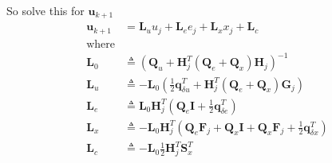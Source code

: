 \documentclass[landscape]{article}
\begin{document}
So solve this for $\mathbf{u}_{k+1}$
\begin{align}
\mathbf{u}_{k+1} & = \mathbf{L}_u u_j + \mathbf{L}_e e_j + \mathbf{L}_x x_j + \mathbf{L}_c \\
\mathrm{where}   & \\
\mathbf{L}_0     & \triangleq  \left(
\mathbf{Q}_u                              
+  \mathbf{H}_j^T (\mathbf{Q}_e + \mathbf{Q}_x)  \mathbf{H}_j 
\right)^{-1}\\
\mathbf{L}_u     & \triangleq -\mathbf{L}_0 \left(
\frac{1}{2} \mathbf{q}_{\delta u}^T                    
+ \mathbf{H}_j^T (\mathbf{Q}_e + \mathbf{Q}_x)  \mathbf{G}_j  
\right)\\
\mathbf{L}_e     & \triangleq  \mathbf{L}_0 \mathbf{H}_j^T\left(
\mathbf{Q}_e  \mathbf{I}
+  \frac{1}{2} \mathbf{q}_{\delta e}^T    
\right)\\
\mathbf{L}_x     & \triangleq -\mathbf{L}_0 \mathbf{H}_j^T\left(
\mathbf{Q}_e  \mathbf{F}_j 
+   \mathbf{Q}_x  \mathbf{I}      
+   \mathbf{Q}_x  \mathbf{F}_j    
+  \frac{1}{2} \mathbf{q}_{\delta x}^T    
\right)\\
\mathbf{L}_c     & \triangleq -\mathbf{L}_0 \frac{1}{2} \mathbf{H}_j^T \mathbf{S}_x^T
\end{align}
\end{document}
